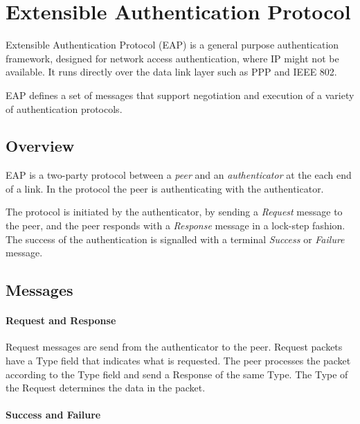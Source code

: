 \section{Extensible Authentication Protocol}

Extensible Authentication Protocol \cite{aboba2004extensible} (EAP) is a general purpose authentication framework, designed for network access authentication, where IP might not be available. 
It runs directly over the data link layer such as PPP  \cite{simpson1994rfc1661} and IEEE 802.

EAP defines a set of messages that support negotiation and execution of a variety of authentication protocols.


\subsection{Overview}
EAP is a two-party protocol between a \textit{peer} and an \textit{authenticator} at the each end of a link. In the protocol the peer is authenticating with the authenticator.

The protocol is initiated by the authenticator, by sending a \textit{Request} message to the peer, and the peer responds with a \textit{Response} message in a lock-step fashion. 
The success of the authentication is signalled  with a terminal \textit{Success} or \textit{Failure} message.

\subsection{Messages}


\paragraph{Request and Response} %

Request messages are send from the authenticator to the peer.
Request packets have a Type field that indicates what is requested.
The peer processes the packet according to the Type field and send a Response of the same Type.
The Type of the Request determines the data in the packet.

\paragraph{Success and Failure} %

